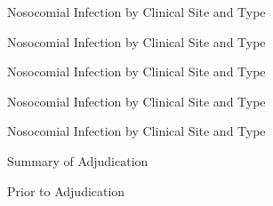 \documentclass[dvips,10pt]{article}
\begin{document}
\begin{figure}
\caption{Nosocomial Infection by Clinical Site and Type}
\end{figure}

\begin{figure}
\caption{Nosocomial Infection by Clinical Site and Type}
\end{figure}

\begin{figure}
\caption{Nosocomial Infection by Clinical Site and Type}
\end{figure}

\begin{figure}
\caption{Nosocomial Infection by Clinical Site and Type}
\end{figure}

\begin{figure}
\caption{Nosocomial Infection by Clinical Site and Type}
\end{figure}
\clearpage

\begin{figure}
\caption{Summary of Adjudication}
\end{figure}
\clearpage

\begin{figure}
\caption{Prior to Adjudication}
\end{figure}
\clearpage
\end{document}
